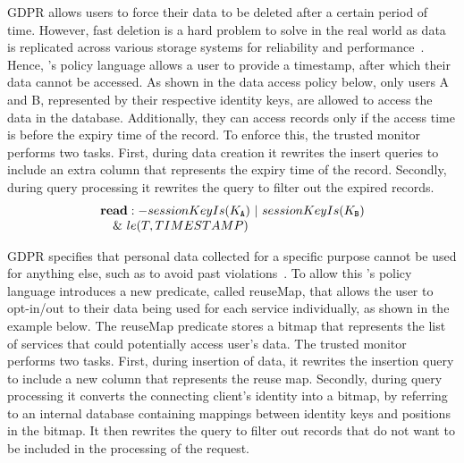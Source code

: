 GDPR allows users to force their data to be deleted after a certain period of time. However, fast deletion is a hard problem to solve in the real world as data is replicated across various storage systems for reliability and performance~\cite{google-data-del}. Hence, \project{}'s policy language allows a user to provide a timestamp, after which their data cannot be accessed. As shown in the data access policy below, only users A and B, represented by their respective identity keys, are allowed to access the data in the database. Additionally, they can access records only if the access time is before the expiry time of the record. To enforce this, the trusted monitor performs two tasks. First, during data creation it rewrites the insert queries to include an extra column that represents the expiry time of the record. Secondly, during query processing it rewrites the query to filter out the expired records.
\vspace{-2mm}
\[
 \begin{array}{@{}l@{}}
 \textbf{read}:-sessionKeyIs(K_{\tt A})~|~sessionKeyIs(K_{\tt B}) \\
 ~~~\&~le(T, TIMESTAMP)
 \end{array}
\]
\vspace{-4mm}

 GDPR specifies that personal data collected for a specific purpose cannot be used for anything else, such as to avoid past violations~\cite{french-fine-google}.
To allow this \project{}'s policy language introduces a new predicate, called reuseMap, that allows the user to opt-in/out to their data being used for each service individually, as shown in the example below. The reuseMap predicate stores a bitmap that represents the list of services that could potentially access user's data. The trusted monitor performs two tasks. First, during insertion of data, it rewrites the insertion query to include a new column that represents the reuse map. Secondly, during query processing it converts the connecting client's identity into a bitmap, by referring to an internal database containing mappings between identity keys and positions in the bitmap. It then rewrites the query to filter out records that do not want to be included in the processing of the request.


